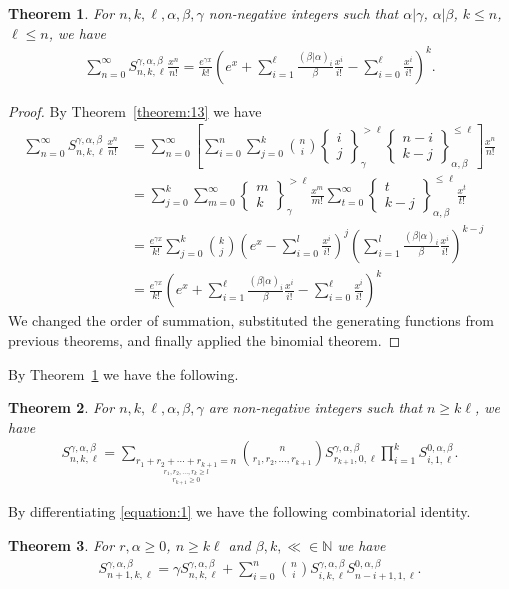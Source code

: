 \documentclass[12pt, reqno]{amsart}
\newtheorem{proof 1}{proof 1}
\newtheorem{theorem}{Theorem}[section]
\def\sts#1#2{\begin{Bmatrix}
#1 \\ #2 \end{Bmatrix}}
\begin{document}
\begin{theorem}\label{theorem:20}For $n,k,\ell, \alpha,\beta,\gamma$ non-negative integers such that $\alpha|\gamma$, $\alpha|\beta$, $k\leq n$, $\ell\leq n$,  we have
	\begin{align}\label{equation:1}
	\sum_{n=0}^{\infty}S^{\gamma,\alpha,\beta}_{n,k,\ell} \frac{x^n}{n!}=\frac{e^{\gamma x}}{k!}\left(e^x+\sum_{i=1}^{\ell}\frac{(\beta|\alpha)_i}{\beta}\frac{x^i}{i!}-\sum_{i=0}^{\ell}\frac{x^i}{i!}\right)^k.
\end{align}
\end{theorem}
\begin{proof} By Theorem~\ref{theorem:13}  we have
\begin{align*}
\sum\limits_{n=0}^\infty 	S^{\gamma,\alpha,\beta}_{n,k,\ell}\frac{x^n}{n!}&=	\sum_{n=0}^{\infty}\left[
		\sum_{i=0}^n\sum_{j=0}^k\binom{n}{i}\sts{i}{j}_{\gamma}^{> \ell}\sts{n-i}{k-j}_{\alpha,\beta}^{\leq \ell}
	\right]\frac{x^n}{n!} \\&=\sum_{j=0}^k	\sum_{m=0}^\infty\sts{m}{k}_{\gamma}^{>\ell}\frac{x^m}{m!}\sum_{t=0}^\infty\sts{t}{k-j}_{\alpha,\beta}^{\leq \ell}\frac{x^t}{t!}\\&=
		\frac{{e^{\gamma x}}}{k!}\sum_{j=0}^k{\binom{k}{j}}
			\left(e^x-\sum\limits_{i=0}^l\frac{x^i}{i!}\right)^j\left(
			\sum\limits_{i=1}^l\frac{(\beta|\alpha)_{i}}{\beta}
			\frac{x^i}{i!}\right)^{k-j}
        \\
        &= \frac{e^{\gamma x}}{k!}\left(e^x+\sum_{i=1}^\ell\frac{(\beta|\alpha)_i}{\beta}\frac{x^i}{i!}-\sum_{i=0}^{\ell}\frac{x^i}{i!}\right)^k
	\end{align*}
We changed the order of summation, substituted the generating functions from previous theorems, and finally applied the binomial theorem. 

\end{proof}

By Theorem~\ref{theorem:20} we have the following.
\begin{theorem}For $n,k,\ell, \alpha, \beta,\gamma$ are non-negative integers such that  $n\geq k\ell$,  we have
	\begin{align*}
S^{\gamma,\alpha,\beta}_{n,k,\ell}=\sum_{\underset{r_{k+1}\geq0}{\underset{r_1,r_2,\ldots,r_k\geq l}{ r_1+r_2+\cdots+r_{k+1}=n}}}\binom{n}{r_1,r_2,\ldots,r_{k+1}}S^{\gamma,\alpha,\beta}_{r_{k+1},0,\ell}\prod_{i=1}^{k}	S^{0,\alpha,\beta}_{i,1,\ell}.
	\end{align*}
\end{theorem}

By differentiating \eqref{equation:1} we have the following combinatorial identity.
\begin{theorem}For $r,\alpha\geq 0$, $n\geq k\ell$ and $\beta,k,\ll\in \mathbb{N}$ we have
	\begin{align*}
		S^{\gamma,\alpha,\beta}_{n+1,k,\ell}=\gamma S^{\gamma,\alpha,\beta}_{n,k,\ell}+\sum_{i=0}^n\binom{n}{i}S^{\gamma,\alpha,\beta}_{i,k,\ell}S^{0,\alpha,\beta}_{n-i+1,1,\ell}.
	\end{align*}
\end{theorem}
\end{document}
